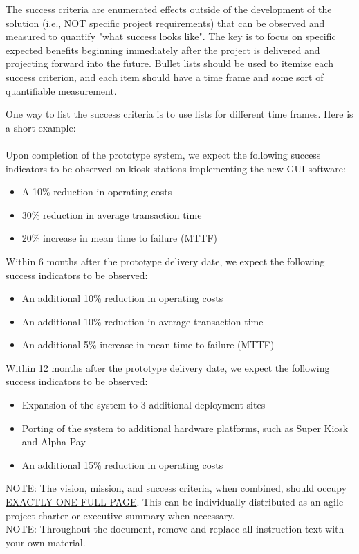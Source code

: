 The success criteria are enumerated effects outside of the development of the solution (i.e., NOT specific project requirements) that can be observed and measured to quantify "what success looks like". The key is to focus on specific expected benefits beginning immediately after the project is delivered and projecting forward into the future. Bullet lists should be used to itemize each success criterion, and each item should have a time frame and some sort of quantifiable measurement.

One way to list the success criteria is to use lists for different time frames. Here is a short example:
\\
\\
Upon completion of the prototype system, we expect the following success indicators to be observed on kiosk stations implementing the new GUI software:
\begin{itemize}
  \item A 10\% reduction in operating costs
  \item 30\% reduction in average transaction time
  \item 20\% increase in mean time to failure (MTTF)
\end{itemize}

Within 6 months after the prototype delivery date, we expect the following success indicators to be observed:
\begin{itemize}
  \item An additional 10\% reduction in operating costs
  \item An additional 10\% reduction in average transaction time
  \item An additional 5\% increase in mean time to failure (MTTF)
\end{itemize}

Within 12 months after the prototype delivery date, we expect the following success indicators to be observed:
\begin{itemize}
  \item Expansion of the system to 3 additional deployment sites
  \item Porting of the system to additional hardware platforms, such as Super Kiosk and Alpha Pay
  \item An additional 15\% reduction in operating costs
\end{itemize}
NOTE: The vision, mission, and success criteria, when combined, should occupy \underline{EXACTLY ONE FULL PAGE}. This can be individually distributed as an agile project charter or executive summary when necessary. 
\\
NOTE: Throughout the document, remove and replace all instruction text with your own material. 
